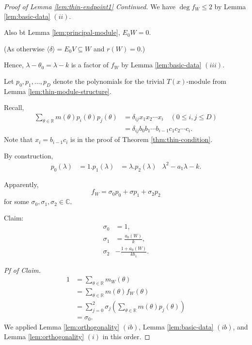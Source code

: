 \documentclass[
]{book}
\theoremstyle{definition}
\theoremstyle{definition}
\theoremstyle{definition}
\theoremstyle{definition}
\theoremstyle{remark}
\begin{document}
\begin{proof}[Proof of Lemma \ref{lem:thin-endpoint1} Continued]
\leavevmode

We have \(\deg f_W\leq 2\) by Lemma \ref{lem:basic-data} \((ii)\).

Also bt Lemma \ref{lem:principal-module}, \(E_0W = 0\).

(As otherwise \(\langle \delta \rangle = E_0V \subseteq W\) and \(r(W) = 0\).)

Hence, \(\lambda - \theta_0 = \lambda - k\) is a factor of \(f_W\) by Lemma \ref{lem:basic-data} \((iii)\).

Let \(p_0, p_1, \ldots, p_D\) denote the polynomials for the trivial \(T(x)\)-module from Lemma \ref{lem:thin-module-structure}.

Recall,
\begin{align}
\sum_{\theta\in \mathbb{R}}m(\theta)p_i(\theta)p_j(\theta) & = \delta_{ij}x_1x_2\cdots x_i \quad (0\leq i,j\leq D)\\
& = \delta_{ij}b_0b_1\cdots b_{i-1}c_1c_2\cdots c_i.
\end{align}
Note that \(x_i = b_{i-1}c_i\) is in the proof of Theorem \ref{thm:thin-condition}.

By construction,
\begin{align}
p_0(\lambda) & = 1.
p_1(\lambda) & = \lambda.
p_2(\lambda) & \lambda^2 - a_1\lambda - k.
\end{align}

Apparently,
\[f_W = \sigma_0 p_0 + \sigma p_1 + \sigma_2 p_2\]
for some \(\sigma_0, \sigma_1, \sigma_2\in \mathbb{C}\).

Claim:
\begin{align}
\sigma_0 & = 1,\\
\sigma_1 & = \frac{a_0(W)}{k},\\
\sigma_2 & -\frac{1+a_0(W)}{kb_1}.
\end{align}

\emph{Pf of Claim.}
\begin{align}
1 & = \sum_{\theta\in \mathbb{R}}m_W(\theta)\\
& = \sum_{\theta\in \mathbb{R}}m(\theta)f_W(\theta)\\
& = \sum_{j=0}^2 \sigma_j\left(\sum_{\theta\in \mathbb{R}}m(\theta)p_j(\theta)\right)\\
& = \sigma_0.
\end{align}
We applied Lemma \ref{lem:orthogonality} \((ib)\), Lemma \ref{lem:basic-data} \((ib)\), and Lemma \ref{lem:orthogonality} \((i)\) in this order.


\end{proof}
\end{document}
